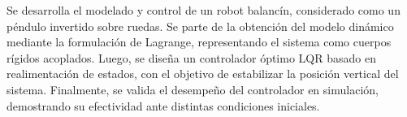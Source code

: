 Se desarrolla el modelado y control de un robot balancín, considerado como un péndulo invertido sobre ruedas. Se parte de la obtención del modelo dinámico mediante la formulación de Lagrange, representando el sistema como cuerpos rígidos acoplados. Luego, se diseña un controlador óptimo LQR basado en realimentación de estados, con el objetivo de estabilizar la posición vertical del sistema. Finalmente, se valida el desempeño del controlador en simulación, demostrando su efectividad ante distintas condiciones iniciales.